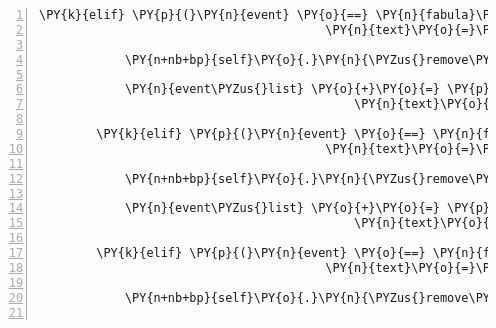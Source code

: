 \begin{Verbatim}[commandchars=\\\{\},numbers=left,firstnumber=1,stepnumber=1]
        \PY{k}{elif} \PY{p}{(}\PY{n}{event} \PY{o}{==} \PY{n}{fabula}\PY{o}{.}\PY{n}{SaysEvent}\PY{p}{(}\PY{n}{identifier}\PY{o}{=}\PY{n}{ID\PYZus{}CASSANDRA}\PY{p}{,}
                                        \PY{n}{text}\PY{o}{=}\PY{l+s}{\PYZsq{}}\PY{l+s}{Die Tür zum Gnomenweg ist offen! Aber da pass ich nicht durch.}\PY{l+s}{\PYZsq{}}\PY{p}{)}\PY{p}{)}\PY{p}{:}

            \PY{n+nb+bp}{self}\PY{o}{.}\PY{n}{\PYZus{}remove\PYZus{}sentence}\PY{p}{(}\PY{n}{ID\PYZus{}CASSANDRA}\PY{p}{,} \PY{n}{event}\PY{o}{.}\PY{n}{text}\PY{p}{)}

            \PY{n}{event\PYZus{}list} \PY{o}{+}\PY{o}{=} \PY{p}{[}\PY{n}{fabula}\PY{o}{.}\PY{n}{SaysEvent}\PY{p}{(}\PY{n}{identifier}\PY{o}{=}\PY{n}{ID\PYZus{}KUNI}\PY{p}{,}
                                            \PY{n}{text}\PY{o}{=}\PY{l+s}{\PYZsq{}}\PY{l+s}{Dann flieg doch beim Schild über den Fluss.}\PY{l+s}{\PYZsq{}}\PY{p}{)}\PY{p}{]}

        \PY{k}{elif} \PY{p}{(}\PY{n}{event} \PY{o}{==} \PY{n}{fabula}\PY{o}{.}\PY{n}{SaysEvent}\PY{p}{(}\PY{n}{identifier}\PY{o}{=}\PY{n}{ID\PYZus{}CASSANDRA}\PY{p}{,}
                                        \PY{n}{text}\PY{o}{=}\PY{l+s}{\PYZsq{}}\PY{l+s}{Ich glaube, ich hab den Eingang zum Gnomenweg gefunden.}\PY{l+s}{\PYZsq{}}\PY{p}{)}\PY{p}{)}\PY{p}{:}

            \PY{n+nb+bp}{self}\PY{o}{.}\PY{n}{\PYZus{}remove\PYZus{}sentence}\PY{p}{(}\PY{n}{ID\PYZus{}CASSANDRA}\PY{p}{,} \PY{n}{event}\PY{o}{.}\PY{n}{text}\PY{p}{)}

            \PY{n}{event\PYZus{}list} \PY{o}{+}\PY{o}{=} \PY{p}{[}\PY{n}{fabula}\PY{o}{.}\PY{n}{SaysEvent}\PY{p}{(}\PY{n}{identifier}\PY{o}{=}\PY{n}{ID\PYZus{}KUNI}\PY{p}{,}
                                            \PY{n}{text}\PY{o}{=}\PY{l+s}{\PYZsq{}}\PY{l+s}{Ich wusste doch, dass der hier irgendwo sein muss!}\PY{l+s}{\PYZsq{}}\PY{p}{)}\PY{p}{]}

        \PY{k}{elif} \PY{p}{(}\PY{n}{event} \PY{o}{==} \PY{n}{fabula}\PY{o}{.}\PY{n}{SaysEvent}\PY{p}{(}\PY{n}{identifier}\PY{o}{=}\PY{n}{ID\PYZus{}CASSANDRA}\PY{p}{,}
                                        \PY{n}{text}\PY{o}{=}\PY{l+s}{\PYZsq{}}\PY{l+s}{Laut dem Schild an der Brücke ist das Überfliegen erlaubt!}\PY{l+s}{\PYZsq{}}\PY{p}{)}\PY{p}{)}\PY{p}{:}

            \PY{n+nb+bp}{self}\PY{o}{.}\PY{n}{\PYZus{}remove\PYZus{}sentence}\PY{p}{(}\PY{n}{ID\PYZus{}CASSANDRA}\PY{p}{,} \PY{n}{event}\PY{o}{.}\PY{n}{text}\PY{p}{)}


\end{Verbatim}
